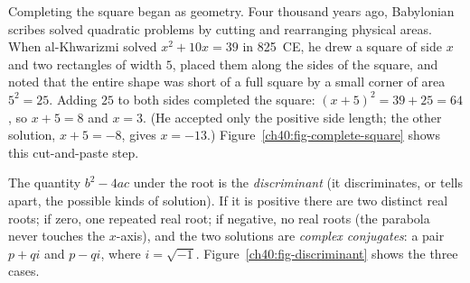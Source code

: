 \begin{connectionbox}
Completing the square began as geometry. Four thousand years ago,
Babylonian scribes solved quadratic problems by cutting and rearranging physical areas.
When al-Khwarizmi solved $x^2 + 10x = 39$ in 825~CE, he drew a square of side $x$ and two
rectangles of width $5$, placed them along the sides of the square, and noted that the
entire shape was short of a full square by a small corner of area $5^2 = 25$. Adding $25$
to both sides completed the square: $(x+5)^2 = 39 + 25 = 64$, so
$x + 5 = 8$ and $x = 3$. (He accepted only the positive side length; the other
solution, $x+5=-8$, gives $x=-13$.) Figure~\ref{ch40:fig-complete-square} shows
this cut-and-paste step.
\end{connectionbox}

The quantity $b^2 - 4ac$ under the root is the \emph{discriminant} (it
discriminates, or tells apart, the possible kinds of solution). If it is
positive there are two distinct real roots; if zero, one repeated real root; if
negative, no real roots (the parabola never touches the $x$-axis), and the two
solutions are \emph{complex conjugates}: a pair $p+qi$ and $p-qi$, where
$i=\sqrt{-1}$. Figure~\ref{ch40:fig-discriminant} shows the three cases.


